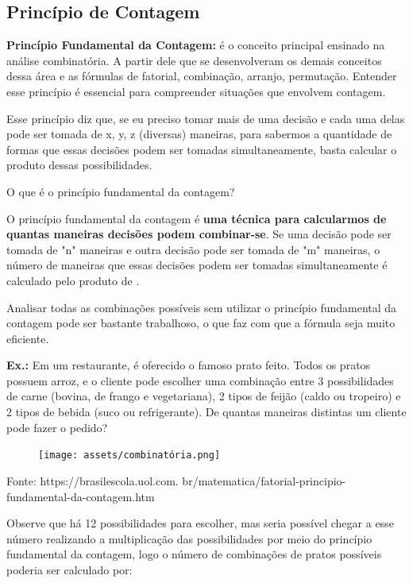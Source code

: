 \begin{multicols*}{2}

	\section{Princípio de Contagem}

	\textbf{Princípio Fundamental da Contagem:} é o  conceito principal ensinado na análise combinatória. A partir dele que se desenvolveram os demais conceitos dessa área e as fórmulas de fatorial, combinação, arranjo, permutação. Entender esse princípio é essencial para compreender situações que envolvem contagem.

	Esse princípio diz que, se eu preciso tomar mais de uma decisão e cada uma delas pode ser tomada de x, y, z (diversas) maneiras, para sabermos a quantidade de formas que essas decisões podem ser tomadas simultaneamente, basta calcular o produto dessas possibilidades.

	O que é o princípio fundamental da contagem?

	O princípio fundamental da contagem é \textbf{uma técnica para calcularmos de quantas maneiras decisões podem combinar-se}. Se uma decisão pode ser tomada de "n" maneiras e outra decisão pode ser tomada de "m" maneiras, o número de maneiras que essas decisões podem ser tomadas simultaneamente é calculado pelo produto de .

	Analisar todas as combinações possíveis sem utilizar o princípio fundamental da contagem pode ser bastante trabalhoso, o que faz com que a fórmula seja muito eficiente.

	\textbf{Ex.:} Em um restaurante, é oferecido o famoso prato feito. Todos os pratos possuem arroz, e o cliente pode escolher uma combinação entre 3 possibilidades de carne (bovina, de frango e vegetariana), 2 tipos de feijão (caldo ou tropeiro) e 2 tipos de bebida (suco ou refrigerante). De quantas maneiras distintas um cliente pode fazer o pedido?

	\begin{figure}[H]
		\centering
		\texttt{[image: assets/combinatória.png]}
	\end{figure}
	Fonte: https://brasilescola.uol.com. br/matematica/fatorial-principio- fundamental-da-contagem.htm

	Observe que há 12 possibilidades para escolher, mas seria possível chegar a esse número realizando a multiplicação das possibilidades por meio do princípio fundamental da contagem, logo o número de combinações de pratos possíveis poderia ser calculado por:


\end{multicols*}
